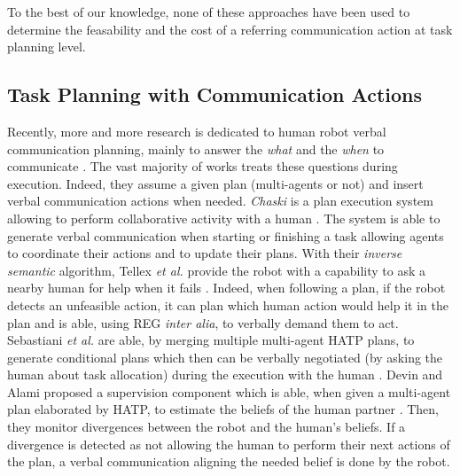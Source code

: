 \documentclass[a4paper,11pt,twoside]{StyleThese}
\begin{document}
To the best of our knowledge, none of these approaches have been used to determine the feasability and the cost of a referring communication action at task planning level.



\subsection{Task Planning with Communication Actions}

Recently, more and more research is dedicated to human robot verbal communication planning, mainly to answer the \textit{what} and the \textit{when} to communicate \cite{mavridis2015review}. The vast majority of works treats these questions during execution. Indeed, they assume a given plan (multi-agents or not) and insert verbal communication actions when needed.
\textit{Chaski} is a plan execution system allowing to perform collaborative activity with a human \cite{shah2011improved}. The system is able to generate verbal communication when starting or finishing a task allowing agents to coordinate their actions and to update their plans.
With their \textit{inverse semantic} algorithm, Tellex \textit{et al.} provide the robot with a capability to ask a nearby human for help when it fails \cite{tellex2014asking}. Indeed, when following a plan, if the robot detects an unfeasible action, it can plan which human action would help it in the plan and is able, using REG \textit{inter alia}, to verbally demand them to act. 
Sebastiani \textit{et al.} are able, by merging multiple multi-agent HATP plans, to generate conditional plans which then can be verbally negotiated (by asking the human about task allocation) during the execution with the human \cite{sebastiani2017dealing}. 
Devin and Alami proposed a supervision component which is able, when given a multi-agent plan elaborated by HATP, to estimate the beliefs of the human partner \cite{devin2016implemented}. Then, they monitor divergences between the robot and the human's beliefs. If a divergence is detected as not allowing the human to perform their next actions of the plan, a verbal communication aligning the needed belief is done by the robot. 
\end{document}

